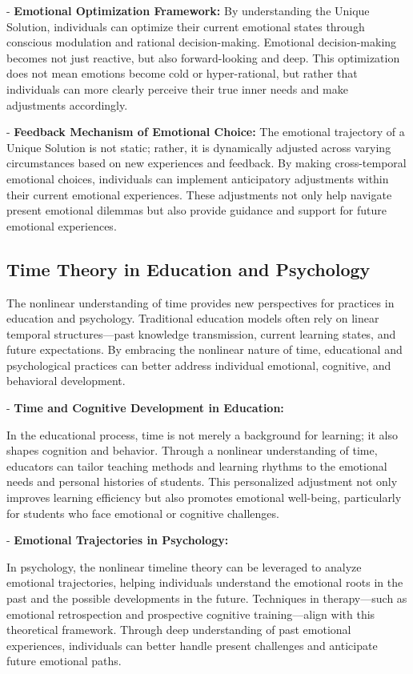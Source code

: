 \documentclass{article}
\begin{document}
- \textbf{Emotional Optimization Framework:} By understanding the Unique Solution, individuals can optimize their current emotional states through conscious modulation and rational decision-making. Emotional decision-making becomes not just reactive, but also forward-looking and deep. This optimization does not mean emotions become cold or hyper-rational, but rather that individuals can more clearly perceive their true inner needs and make adjustments accordingly.

- \textbf{Feedback Mechanism of Emotional Choice:} The emotional trajectory of a Unique Solution is not static; rather, it is dynamically adjusted across varying circumstances based on new experiences and feedback. By making cross-temporal emotional choices, individuals can implement anticipatory adjustments within their current emotional experiences. These adjustments not only help navigate present emotional dilemmas but also provide guidance and support for future emotional experiences.

\subsection{Time Theory in Education and Psychology}

The nonlinear understanding of time provides new perspectives for practices in education and psychology. Traditional education models often rely on linear temporal structures—past knowledge transmission, current learning states, and future expectations. By embracing the nonlinear nature of time, educational and psychological practices can better address individual emotional, cognitive, and behavioral development.

- \textbf{Time and Cognitive Development in Education:}

In the educational process, time is not merely a background for learning; it also shapes cognition and behavior. Through a nonlinear understanding of time, educators can tailor teaching methods and learning rhythms to the emotional needs and personal histories of students. This personalized adjustment not only improves learning efficiency but also promotes emotional well-being, particularly for students who face emotional or cognitive challenges.

- \textbf{Emotional Trajectories in Psychology:}

In psychology, the nonlinear timeline theory can be leveraged to analyze emotional trajectories, helping individuals understand the emotional roots in the past and the possible developments in the future. Techniques in therapy—such as emotional retrospection and prospective cognitive training—align with this theoretical framework. Through deep understanding of past emotional experiences, individuals can better handle present challenges and anticipate future emotional paths.
\end{document}
